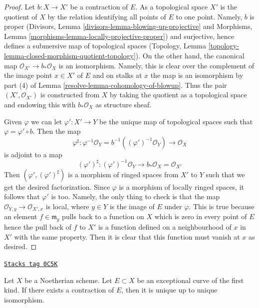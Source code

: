 \begin{proof}

Let $b : X \to X'$ be a contraction of $E$. As a topological space
$X'$ is the quotient of $X$ by the relation identifying all points
of $E$ to one point. Namely, $b$ is proper
(Divisors, Lemma \ref{divisors-lemma-blowing-up-projective} and
Morphisms, Lemma \ref{morphisms-lemma-locally-projective-proper})
and surjective, hence defines a submersive map of topological
spaces (Topology, Lemma
\ref{topology-lemma-closed-morphism-quotient-topology}).
On the other hand, the canonical map
$\mathcal{O}_{X'} \to b_*\mathcal{O}_X$ is an isomorphism. Namely,
this is clear over the complement of the image point $x \in X'$ of $E$
and on stalks at $x$ the map is an isomorphism by part (4) of
Lemma \ref{resolve-lemma-cohomology-of-blowup}.
Thus the pair $(X', \mathcal{O}_{X'})$ is constructed
from $X$ by taking the quotient as a topological space
and endowing this with $b_*\mathcal{O}_X$ as structure sheaf.

\medskip\noindent
Given $\varphi$ we can let $\varphi' : X' \to Y$ be the unique map of
topological spaces such that $\varphi = \varphi' \circ b$.
Then the map
$$
\varphi^\sharp : \varphi^{-1}\mathcal{O}_Y =
b^{-1}((\varphi')^{-1}\mathcal{O}_Y) \to \mathcal{O}_X
$$
is adjoint to a map
$$
(\varphi')^\sharp :
(\varphi')^{-1}\mathcal{O}_Y \to b_*\mathcal{O}_X = \mathcal{O}_{X'}
$$
Then $(\varphi', (\varphi')^\sharp)$ is a morphism of ringed spaces
from $X'$ to $Y$ such that we get the desired factorization. Since
$\varphi$ is a morphism of locally ringed spaces, it follows that
$\varphi'$ is too. Namely, the only thing to check is that the map
$\mathcal{O}_{Y, y} \to \mathcal{O}_{X', x}$ is local, where $y \in Y$
is the image of $E$ under $\varphi$. This is true because an element
$f \in \mathfrak m_y$ pulls back to a function on $X$ which is zero
in every point of $E$ hence the pull back of $f$ to $X'$ is a function
defined on a neighbourhood of $x$ in $X'$ with the same property.
Then it is clear that this function must vanish at $x$ as desired.
\end{proof}

\begin{lemma}
\label{resolve-lemma-contraction-unique}
\href{https://stacks.math.columbia.edu/tag/0C5K}{\texttt{Stacks tag 0C5K}}

Let $X$ be a Noetherian scheme. Let $E \subset X$ be an
exceptional curve of the first kind. If there exists a contraction
of $E$, then it is unique up to unique isomorphism.
\end{lemma}

